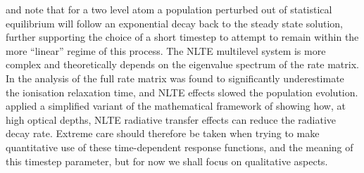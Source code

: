 \citet{Carlsson2002} and \citet{Judge2005} note that for a two level atom a population perturbed out of statistical equilibrium will follow an exponential decay back to the steady state solution, further supporting the choice of a short timestep to attempt to remain within the more ``linear'' regime of this process.
The NLTE multilevel system is more complex and theoretically depends on the eigenvalue spectrum of the rate matrix.
In the analysis of \citet{Carlsson2002} the full rate matrix was found to significantly underestimate the ionisation relaxation time, and NLTE effects slowed the population evolution.
\citet{Judge2005} applied a simplified variant of the mathematical framework of \citet{Gayley1990} showing how, at high optical depths, NLTE radiative transfer effects can reduce the radiative decay rate.
Extreme care should therefore be taken when trying to make quantitative use of these time-dependent response functions, and the meaning of this timestep parameter, but for now we shall focus on qualitative aspects.

